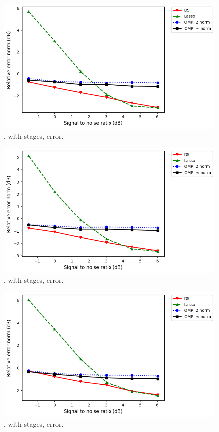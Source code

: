 %
\begin {figure} [H]
\includegraphics [width = 0.8 \textwidth] {error-medium-more-square-nine-usual.png}
\caption {, with  stages, error.}
\end {figure}
%
\begin {figure} [H]
\includegraphics [width = 0.8 \textwidth] {error-medium-more-wide-nine-usual.png}
\caption {, with  stages, error.}
\end {figure}
%
\begin {figure} [H]
\includegraphics [width = 0.8 \textwidth] {error-medium-more-tall-nine-usual.png}
\caption {, with  stages, error.}
\end {figure}

